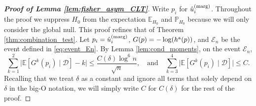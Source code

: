 \documentclass[11pt]{article}
\def\E{\mathbb{E}}
\def\marg{\textnormal{(marg)}}
\def\asym{\textnormal{a}}
\renewcommand{\P}{\mathbb{P}}
\newcommand{\D}{\mathcal{D}}
\newcommand{\event}{\mathcal{E}}
\begin{document}
\begin{proof}[\textbf{Proof of Lemma \ref{lem:fisher_asym_CLT}}]
Write $p_i$ for $\hat{u}^\marg_i$. Throughout the proof we suppress $H_0$ from the expectation $\E_{H_0}$ and $\P_{H_0}$ because we will only consider the global null. This proof refines that of Theorem \ref{thm:combination_test}. Let $p_i = \hat{u}_i^\marg$, $G(p) = -\log(h^\asym(p))$, and $\event_{n}$ be the event defined in \eqref{eq:event_En}. By Lemma \ref{lem:cond_moments}, on the event $\event_n$,
\[\sum_{k=1}^{2}\bigg|\E[G^k(p_i)\mid \D] - k\bigg| \le \frac{C(\delta)\log^6 n}{\sqrt{n}}, \quad \text{and}\quad \sum_{k=3}^{4}\bigg|\E[G^k(p_i)\mid \D]\bigg| \le C.\]
Recalling that we treat $\delta$ as a constant and ignore all terms that solely depend on $\delta$ in the big-O notation, we will simply write $C$ for $C(\delta)$ for the rest of the proof.


\end{proof}
\end{document}

